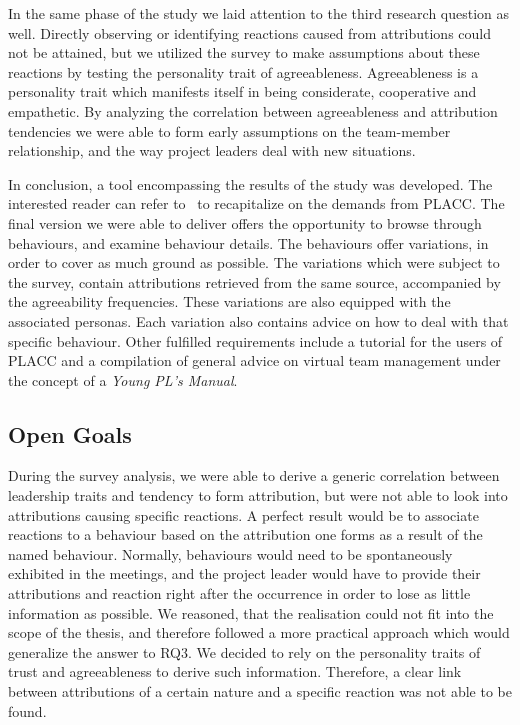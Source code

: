 In the same phase of the study we laid attention to the third research question as well. Directly observing or identifying reactions caused from attributions could not be attained, but we utilized the survey to make assumptions about these reactions by testing the personality trait of agreeableness.  Agreeableness is a personality trait which manifests itself in being considerate, cooperative and empathetic.  By analyzing the correlation between agreeableness and attribution tendencies we were able to form early assumptions on the team-member relationship,  and the way project leaders deal with new situations. 

In conclusion, a tool encompassing the results of the study was developed.  The interested reader can refer to~ to recapitalize on the demands from PLACC.  The final version we were able to deliver offers the opportunity to browse through behaviours, and examine behaviour details. The behaviours offer variations, in order to cover as much ground as possible. The variations which were subject to the survey, contain attributions retrieved from the same source, accompanied by the agreeability frequencies.  These variations are also equipped with the associated personas.  Each variation also contains advice on how to deal with that specific behaviour.  Other fulfilled requirements include a tutorial for the users of PLACC and a compilation of general advice on virtual team management under the concept of a \textit{Young PL's Manual}.  


\subsection{Open Goals}

During the survey analysis, we were able to derive a generic correlation between leadership traits and tendency to form attribution,  but were not able to look into attributions causing specific reactions.  A perfect result would be to associate reactions to a behaviour based on the attribution one forms as a result of the named behaviour. Normally, behaviours would need to be spontaneously exhibited in the meetings, and the project leader would have to provide their attributions and reaction right after the occurrence in order to lose as little information as possible.  We reasoned, that the realisation could not fit into the scope of the thesis, and therefore followed a more practical approach which would generalize the answer to RQ3.  We decided to rely on the personality traits of trust and agreeableness to derive such information.  Therefore,  a clear link between attributions of a certain nature and a specific reaction was not able to be found.

